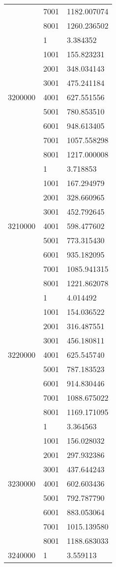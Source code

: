 \begin{table}[htb!]
\begin{tabular}{lll}
 & 7001 & 1182.007074 \\
 & 8001 & 1260.236502 \\
\multirow[c]{9}{*}{3200000} & 1 & 3.384352 \\
 & 1001 & 155.823231 \\
 & 2001 & 348.034143 \\
 & 3001 & 475.241184 \\
 & 4001 & 627.551556 \\
 & 5001 & 780.853510 \\
 & 6001 & 948.613405 \\
 & 7001 & 1057.558298 \\
 & 8001 & 1217.000008 \\
\multirow[c]{9}{*}{3210000} & 1 & 3.718853 \\
 & 1001 & 167.294979 \\
 & 2001 & 328.660965 \\
 & 3001 & 452.792645 \\
 & 4001 & 598.477602 \\
 & 5001 & 773.315430 \\
 & 6001 & 935.182095 \\
 & 7001 & 1085.941315 \\
 & 8001 & 1221.862078 \\
\multirow[c]{9}{*}{3220000} & 1 & 4.014492 \\
 & 1001 & 154.036522 \\
 & 2001 & 316.487551 \\
 & 3001 & 456.180811 \\
 & 4001 & 625.545740 \\
 & 5001 & 787.183523 \\
 & 6001 & 914.830446 \\
 & 7001 & 1088.675022 \\
 & 8001 & 1169.171095 \\
\multirow[c]{9}{*}{3230000} & 1 & 3.364563 \\
 & 1001 & 156.028032 \\
 & 2001 & 297.932386 \\
 & 3001 & 437.644243 \\
 & 4001 & 602.603436 \\
 & 5001 & 792.787790 \\
 & 6001 & 883.053064 \\
 & 7001 & 1015.139580 \\
 & 8001 & 1188.683033 \\
\multirow[c]{9}{*}{3240000} & 1 & 3.559113 \\

\end{tabular}
\end{table}
